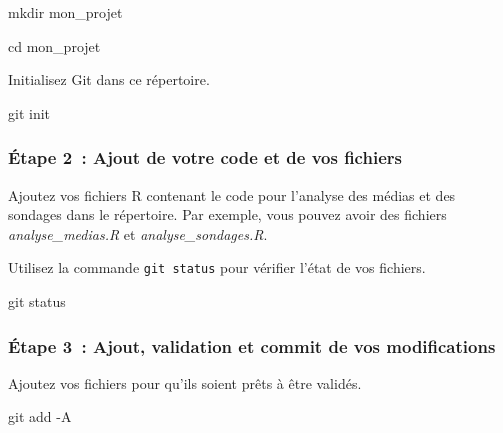 \documentclass[
  letterpaper,
]{scrbook}
\newenvironment{Shaded}{\begin{snugshade}}{\end{snugshade}}
\newcommand{\AttributeTok}[1]{\textcolor[rgb]{0.40,0.45,0.13}{#1}}
\newcommand{\BuiltInTok}[1]{\textcolor[rgb]{0.00,0.23,0.31}{#1}}
\newcommand{\FunctionTok}[1]{\textcolor[rgb]{0.28,0.35,0.67}{#1}}
\newcommand{\NormalTok}[1]{\textcolor[rgb]{0.00,0.23,0.31}{#1}}
\begin{document}
\begin{Shaded}
\begin{Highlighting}[]
\FunctionTok{mkdir}\NormalTok{ mon\_projet}
\end{Highlighting}
\end{Shaded}

\begin{Shaded}
\begin{Highlighting}[]
\BuiltInTok{cd}\NormalTok{ mon\_projet}
\end{Highlighting}
\end{Shaded}

Initialisez Git dans ce répertoire.

\begin{Shaded}
\begin{Highlighting}[]
\FunctionTok{git}\NormalTok{ init}
\end{Highlighting}
\end{Shaded}

\hypertarget{uxe9tape-2-ajout-de-votre-code-et-de-vos-fichiers}{%
\subsubsection{Étape 2~: Ajout de votre code et de vos
fichiers}\label{uxe9tape-2-ajout-de-votre-code-et-de-vos-fichiers}}

Ajoutez vos fichiers R contenant le code pour l'analyse des médias et
des sondages dans le répertoire. Par exemple, vous pouvez avoir des
fichiers \emph{analyse\_medias.R} et \emph{analyse\_sondages.R}.

Utilisez la commande \texttt{git\ status} pour vérifier l'état de vos
fichiers.

\begin{Shaded}
\begin{Highlighting}[]
\FunctionTok{git}\NormalTok{ status}
\end{Highlighting}
\end{Shaded}

\hypertarget{uxe9tape-3-ajout-validation-et-commit-de-vos-modifications}{%
\subsubsection{Étape 3~: Ajout, validation et commit de vos
modifications}\label{uxe9tape-3-ajout-validation-et-commit-de-vos-modifications}}

Ajoutez vos fichiers pour qu'ils soient prêts à être validés.

\begin{Shaded}
\begin{Highlighting}[]
\FunctionTok{git}\NormalTok{ add }\AttributeTok{{-}A}
\end{Highlighting}
\end{Shaded}
\end{document}

